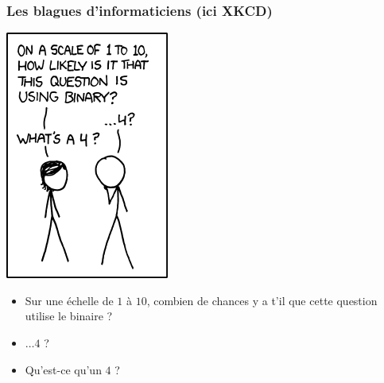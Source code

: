 \documentclass[xcolor=svgnames]{beamer}
\begin{document}
\begin{frame}
  \frametitle{Les blagues d'informaticiens (ici XKCD)}
  \begin{center}
    \includegraphics[scale=0.5]{img/1_to_10.png}
  \end{center}
\pause
\begin{itemize}
\item
  Sur une échelle de $1$ à $10$, combien de chances y a t'il que cette
  question utilise le binaire ?\pause
\item $\ldots4$ ?\pause
\item Qu'est-ce qu'un $4$ ?
\end{itemize}
\end{frame}
\end{document}
